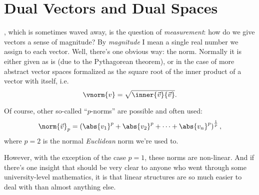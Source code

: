 \section{Dual Vectors and Dual Spaces}

, which is sometimes waved away, is the question of \textit{measurement}: how do we give vectors a sense of magnitude? By \textit{magnitude} I mean a single real number we assign to each vector. Well, there's one obvious way: the norm. Normally it is either given as is (due to the Pythagorean theorem), or in the case of more abstract vector spaces formalized as the square root of the inner product of a vector with itself, i.e.
\begin{equation}
    \vnorm{v} = \sqrt{\inner{\vec{v}}{\vec{v}}}.
    \label{eq:vector_norm}
\end{equation}

Of course, other so-called \enquote{$p$-norms} are possible and often used:
\begin{equation}
    \norm{\vec{v}}_{p} = \left(\abs{v_{1}}^{p}+\abs{v_{2}}^{p} + \dots + \abs{v_{n}}^{p}\right)^{\frac{1}{p}},
    \label{eq:label}
\end{equation}
where $p=2$ is the normal \textit{Euclidean} norm we're used to.

However, with the exception of the case $p=1$, these norms are non-linear. And if there's one insight that should be very clear to anyone who went through some university-level mathematics, it is that linear structures are so much easier to deal with than almost anything else.

